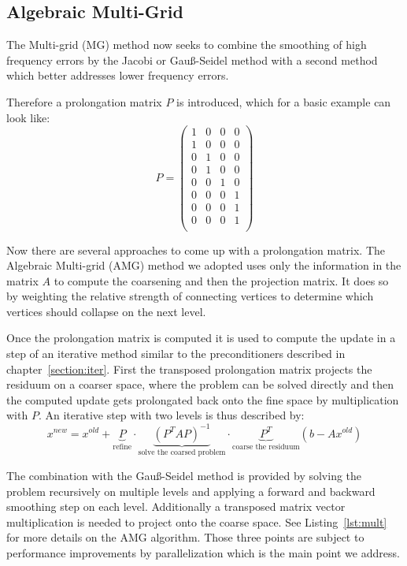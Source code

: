 \documentclass[a4paper,11pt]{scrartcl}
\begin{document}
\subsection{Algebraic Multi-Grid}
The Multi-grid (MG) method now seeks to combine the smoothing of high
frequency errors by the Jacobi or Gauß-Seidel method with a second method which
better addresses lower frequency errors.

Therefore a prolongation matrix $P$ is introduced, which for a basic example
can look like:
$$P =
\begin{pmatrix}
  1 & 0 & 0 & 0 \\
  1 & 0 & 0 & 0 \\
  0 & 1 & 0 & 0 \\
  0 & 1 & 0 & 0 \\
  0 & 0 & 1 & 0 \\
  0 & 0 & 0 & 1 \\
  0 & 0 & 0 & 1 \\
  0 & 0 & 0 & 1 \\
\end{pmatrix}
$$

Now there are several approaches to come up with a prolongation matrix.
The Algebraic Multi-grid (AMG) method we adopted uses only the information
in the matrix $A$ to compute the coarsening and then the projection matrix.
It does so by weighting the relative strength of connecting vertices to
determine which vertices should collapse on the next level.

Once the prolongation matrix is computed it is used to compute the update in a
step of an iterative method similar to the preconditioners described in
chapter~\ref{section:iter}.
First the transposed prolongation matrix projects the residuum on a
coarser space, where the problem can be solved directly and then the computed
update gets prolongated back onto the fine space by multiplication with $P$.
An iterative step with two levels is thus described by:
$$x^{new} = x^{old} +\underbrace{P}_\text{refine}\cdot \underbrace{(P^{T} A P)^{-1}}_\text{solve the coarsed problem}\cdot \underbrace{P^{T}}_\text{coarse the residuum} (b - A x^{old})$$

The combination with the Gauß-Seidel method is provided by solving the problem
recursively on multiple levels and applying a forward and backward smoothing
step on each level. Additionally a transposed matrix vector multiplication
is needed to project onto the coarse space.
See Listing~\ref{lst:mult} for more details on the AMG algorithm.
Those three points are subject to performance improvements by parallelization
which is the main point we address.
\cite{multigrid}
\end{document}
